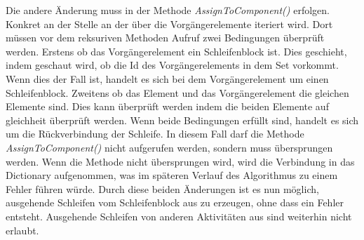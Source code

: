 \documentclass{article}
\begin{document}
    Die andere Änderung muss in der Methode \textit{AssignToComponent()} erfolgen.
    Konkret an der Stelle an der über die Vorgängerelemente iteriert wird.
    Dort müssen vor dem reksuriven Methoden Aufruf zwei Bedingungen überprüft werden.
    Erstens ob das Vorgängerelement ein Schleifenblock ist.
    Dies geschieht, indem geschaut wird, ob die Id des Vorgängerelements in dem Set vorkommt. 
    Wenn dies der Fall ist, handelt es sich bei dem Vorgängerelement um einen Schleifenblock.
    Zweitens ob das Element und das Vorgängerelement die gleichen Elemente sind.
    Dies kann überprüft werden indem die beiden Elemente auf gleichheit überprüft werden.
    Wenn beide Bedingungen erfüllt sind, handelt es sich um die Rückverbindung der Schleife. 
    In diesem Fall darf die Methode \textit{AssignToComponent()} nicht aufgerufen werden, sondern muss übersprungen werden.
    Wenn die Methode nicht übersprungen wird, wird die Verbindung in das Dictionary aufgenommen, was im späteren Verlauf des Algorithmus zu einem Fehler führen würde.
    Durch diese beiden Änderungen ist es nun möglich, ausgehende Schleifen vom Schleifenblock aus zu erzeugen, ohne dass ein Fehler entsteht.
    Ausgehende Schleifen von anderen Aktivitäten aus sind weiterhin nicht erlaubt.
\end{document}
